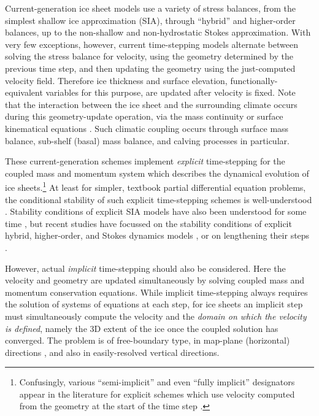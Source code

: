 \documentclass[twocolumn,letterpaper]{igs}
\begin{document}
Current-generation ice sheet models use a variety of stress balances, from the simplest shallow ice approximation (SIA), through ``hybrid'' \citep{Robinsonetal2022,Winkelmannetal2011} and higher-order balances, up to the non-shallow and non-hydrostatic Stokes approximation.  With very few exceptions, however, current time-stepping models alternate between solving the stress balance for velocity, using the geometry determined by the previous time step, and then updating the geometry using the just-computed velocity field.  Therefore ice thickness and surface elevation, functionally-equivalent variables for this purpose, are updated after velocity is fixed.  Note that the interaction between the ice sheet and the surrounding climate occurs during this geometry-update operation, via the mass continuity or surface kinematical equations \citep{GreveBlatter2009}.  Such climatic coupling occurs through surface mass balance, sub-shelf (basal) mass balance, and calving processes in particular.

These current-generation schemes implement \emph{explicit} time-stepping for the coupled mass and momentum system which describes the dynamical evolution of ice sheets.\footnote{Confusingly, various ``semi-implicit'' and even ``fully implicit'' designators appear in the literature for explicit schemes which use velocity computed from the geometry at the start of the time step \citep[for example]{Chengetal2017}.}  At least for simpler, textbook partial differential equation problems, the conditional stability of such explicit time-stepping schemes is well-understood \citep{LeVeque2007}.  Stability conditions of explicit SIA models have also been understood for some time \citep{HindmarshPayne1996}, but recent studies have focussed on the stability conditions of explicit hybrid, higher-order, and Stokes dynamics models \citep{Chengetal2017,Robinsonetal2022}, or on lengthening their steps \citep{LofgrenAhlkronaHelanow2021}.

However, actual \emph{implicit} time-stepping \citep{LeVeque2007} should also be considered.  Here the velocity and geometry are updated simultaneously by solving coupled mass and momentum conservation equations.  While implicit time-stepping always requires the solution of systems of equations at each step, for ice sheets an implicit step must simultaneously compute the velocity and the \emph{domain on which the velocity is defined}, namely the 3D extent of the ice once the coupled solution has converged.  The problem is of free-boundary type, in map-plane (horizontal) directions \citep{SchoofHewitt2013}, and also in easily-resolved vertical directions.
\end{document}
